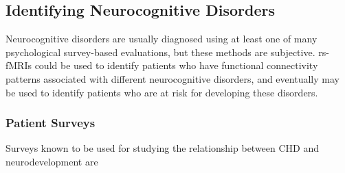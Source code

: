 \subsection{Identifying Neurocognitive Disorders}

Neurocognitive disorders are usually diagnosed using at least one of many psychological survey-based evaluations, but these methods are subjective. rs-fMRIs could be used to identify patients who have functional connectivity patterns associated with different neurocognitive disorders, and eventually may be used to identify patients who are at risk for developing these disorders.

\subsubsection{Patient Surveys}

Surveys known to be used for studying the relationship between CHD and neurodevelopment are

